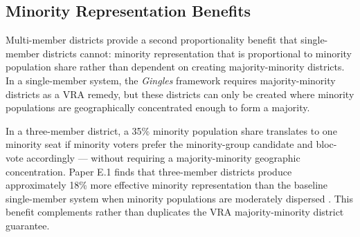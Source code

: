 \subsection{Minority Representation Benefits}

Multi-member districts provide a second proportionality benefit that
single-member districts cannot: minority representation that is
proportional to minority population share rather than dependent on creating
majority-minority districts.  In a single-member system, the \emph{Gingles}
framework \citep{gingles1986} requires majority-minority districts as a VRA
remedy, but these districts can only be created where minority populations
are geographically concentrated enough to form a majority.

In a three-member district, a 35\% minority population share translates to
one minority seat if minority voters prefer the minority-group candidate and
bloc-vote accordingly --- without requiring a majority-minority geographic
concentration.  Paper E.1 finds that three-member districts produce
approximately 18\% more effective minority representation than the baseline
single-member system when minority populations are moderately dispersed
\citep{dellaLibera2026e1}.  This benefit complements rather than duplicates
the VRA majority-minority district guarantee.
